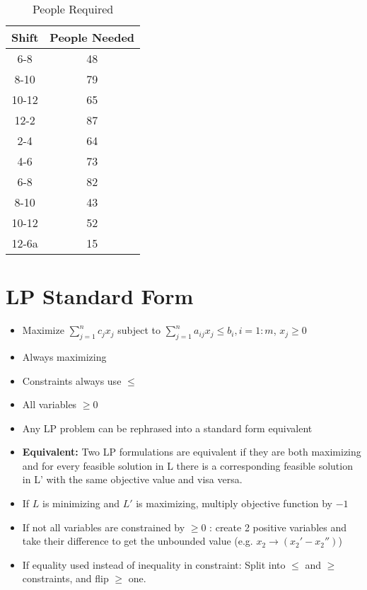 \documentclass[12pt, letter]{article}
\begin{document}
\begin{table}[h]
	\centering
	\caption{People Required}
	\label{tab:numpeople}
	\begin{tabular}{|c|c|}
	\hline
	Shift & People Needed \\
	\hline
	6-8   & 48 \\
	8-10  & 79 \\
	10-12 & 65 \\
	12-2  & 87 \\
	2-4   & 64 \\
	4-6   & 73 \\
	6-8	  & 82 \\
	8-10  & 43 \\
	10-12 & 52 \\
	12-6a & 15 \\
	\hline
	\end{tabular}
\end{table}

\section{LP Standard Form}%
\label{sec:lp_standard_form}
\begin{itemize}
	\item Maximize $\sum_{j=1}^{n} c_jx_j$ subject to $ \sum_{j=1}^{n} a_{ij}x_j \le b_i, i=1:m$, $x_j \ge 0$
	\item Always maximizing
	\item Constraints always use $\le$
	\item All variables $\ge 0$
	\item Any LP problem can be rephrased into a standard form equivalent
	\item \textbf{Equivalent:} Two LP formulations are equivalent if they are both maximizing and for every feasible solution in L there is a corresponding feasible solution in L' with the same objective  value and visa versa.
	\item If $L$ is minimizing and $L'$ is maximizing, multiply objective function by $-1$ 
	\item If not all variables are constrained by $\ge 0$ : create 2 positive variables and take their difference to get the unbounded value (e.g. $x_2 \rightarrow (x_2'-x_2'')$)
	\item If equality used instead of inequality in constraint: Split into $\le$ and $\ge$ constraints, and flip $\ge$ one.
\end{itemize}
\end{document}
